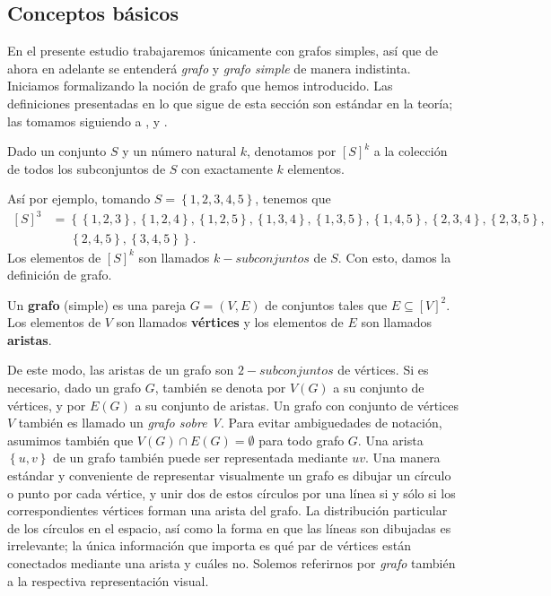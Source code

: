 \subsection{Conceptos básicos}
En el presente estudio trabajaremos únicamente con grafos simples, así que de ahora en adelante se entenderá \textit{grafo} y \textit{grafo simple} de manera indistinta. Iniciamos formalizando la noción de grafo que hemos introducido. Las definiciones presentadas en lo que sigue de esta sección son estándar en la teoría; las tomamos siguiendo a \cite{diestel2017}, \cite{gomez2025} y \cite{jafarian2013}.
\begin{Not}
Dado un conjunto $S$ y un número natural $k$, denotamos por $[S]^k$ a la colección de todos los subconjuntos de $S$ con exactamente $k$ elementos.
\end{Not}\clearpage
Así por ejemplo, tomando $S=\left\lbrace 1,2,3,4,5 \right\rbrace$, tenemos que 
$$
\begin{aligned}
   [S]^3 &= \left\lbrace \left\lbrace 1,2,3\right\rbrace, \left\lbrace 1,2,4\right\rbrace, \left\lbrace 1,2,5\right\rbrace, \left\lbrace 1,3,4\right\rbrace, \left\lbrace 1,3,5\right\rbrace, \left\lbrace 1,4,5\right\rbrace, \left\lbrace 2,3,4\right\rbrace, \left\lbrace 2,3,5\right\rbrace \right.,\\
         &\phantom{ooo} \left. \left\lbrace 2,4,5\right\rbrace, \left\lbrace 3,4,5\right\rbrace\right\rbrace. 
\end{aligned}
$$
Los elementos de $[S]^k$ son llamados $k-subconjuntos$ de $S$. Con esto, damos la definición de grafo.
\begin{Def}
   Un \textbf{grafo} (simple) es una pareja $G=\left( V,E\right)$ de conjuntos tales que $E\subseteq [V]^2$. Los elementos de $V$ son llamados \textbf{vértices} y los elementos de $E$ son llamados \textbf{aristas}.
\end{Def}
De este modo, las aristas de un grafo son $2-subconjuntos$ de vértices. Si es necesario, dado un grafo $G$, también se denota por $V(G)$ a su conjunto de vértices, y por $E(G)$ a su conjunto de aristas. Un grafo con conjunto de vértices $V$ también es llamado un \textit{grafo sobre V}. Para evitar ambiguedades de notación, asumimos también que $V(G)\cap E(G)=\emptyset$ para todo grafo $G$. Una arista $\left\lbrace u,v\right\rbrace$ de un grafo también puede ser representada mediante $uv$. Una manera estándar y conveniente de representar visualmente un grafo es dibujar un círculo o punto por cada vértice, y unir dos de estos círculos por una línea si y sólo si los correspondientes vértices forman una arista del grafo. La distribución particular de los círculos en el espacio, así como la forma en que las líneas son dibujadas es irrelevante; la única información que importa es qué par de vértices están conectados mediante una arista y cuáles no. Solemos referirnos por \textit{grafo} también a la respectiva representación visual.
